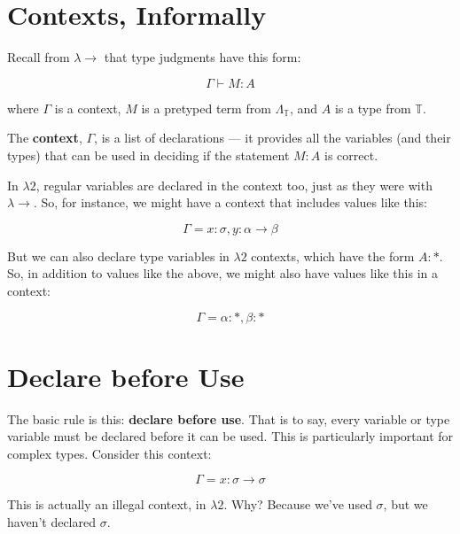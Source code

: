 \documentclass{book}
\numberwithin{equation}{chapter}
\newcommand{\vocab}{\textbf}
\begin{document}
\section{Contexts, Informally}

Recall from $\lambda \rightarrow$ that type judgments have this form:

\begin{equation}
\Gamma \vdash M : A
\end{equation}

\noindent
where $\Gamma$ is a context, $M$ is a pretyped term from $\Lambda_{\mathbb{T}}$, and $A$ is a type from $\mathbb{T}$. 

The \vocab{context}, $\Gamma$, is a list of declarations --- it provides all the variables (and their types) that can be used in deciding if the statement $M : A$ is correct.

In $\lambda 2$, regular variables are declared in the context too, just as they were with $\lambda \rightarrow$. So, for instance, we might have a context that includes values like this:

\begin{equation}
\Gamma = x : \sigma, y : \alpha \rightarrow \beta
\end{equation}

\noindent
But we can also declare type variables in $\lambda 2$ contexts, which have the form $A : *$. So, in addition to values like the above, we might also have values like this in a context:

\begin{equation}
\Gamma = \alpha : *, \beta : *
\end{equation}


\section{Declare before Use}

The basic rule is this: \vocab{declare before use}. That is to say, every variable or type variable must be declared before it can be used. This is particularly important for complex types. Consider this context:

\begin{equation}
\Gamma = x : \sigma \rightarrow \sigma
\end{equation}

\noindent
This is actually an illegal context, in $\lambda 2$. Why? Because we've used $\sigma$, but we haven't declared $\sigma$. 
\end{document}
